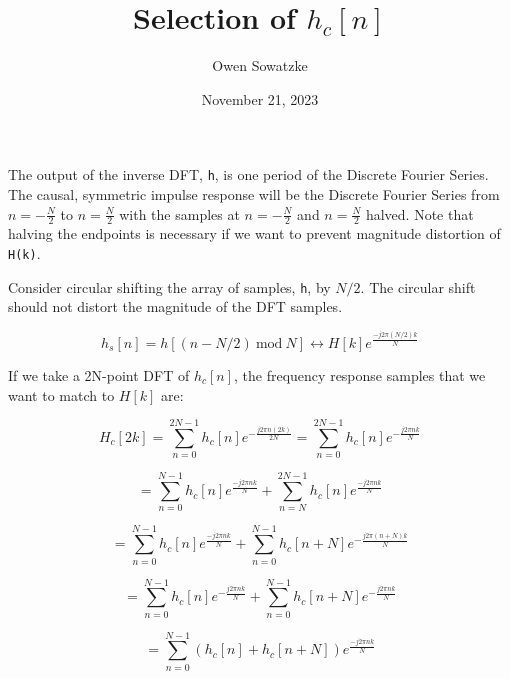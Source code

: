 \documentclass[fleqn]{article}
\title{Selection of $h_c[n]$}
\author{Owen Sowatzke}
\date{November 21, 2023}
\newcommand{\zerodisplayskip}{
	\setlength{\abovedisplayskip}{0pt}%
	\setlength{\belowdisplayskip}{0pt}%
	\setlength{\abovedisplayshortskip}{0pt}%
	\setlength{\belowdisplayshortskip}{0pt}%
	\setlength{\mathindent}{0pt}}
\begin{document}
	\offinterlineskip
	\setlength{\lineskip}{12pt}
	\setlength{\parindent}{0pt} 
	\zerodisplayskip
	\maketitle
	
	The output of the inverse DFT, \texttt{h}, is one period of the Discrete Fourier Series. The causal, symmetric impulse response will be the Discrete Fourier Series from $n=-\frac{N}{2}$ to $n=\frac{N}{2}$ with the samples at $n=-\frac{N}{2}$ and $n=\frac{N}{2}$ halved. Note that halving the endpoints is necessary if we want to prevent magnitude distortion of \texttt{H(k)}.
			 
	Consider circular shifting the array of samples, \texttt{h}, by $N/2$. The circular shift should not distort the magnitude of the DFT samples.
			
	\begin{equation*}
		h_s[n] = h[(n - N/2)\ \text{mod}\ N] \leftrightarrow H[k]e^{\frac{-j{2\pi}(N/2)k}{N}}
	\end{equation*}
			
	If we take a 2N-point DFT of $h_c[n]$, the frequency response samples that we want to match to $H[k]$ are:
			 
	\begin{equation*}
		H_c[2k] = \sum_{n=0}^{2N-1}{h_c[n]e^{-\frac{j2{\pi}n(2k)}{2N}}} = \sum_{n=0}^{2N-1}{h_c[n]e^{-\frac{j2{\pi}nk}{N}}}
	\end{equation*}
			
	\begin{equation*}
		= \sum_{n=0}^{N-1}{h_c[n]e^{\frac{-j2{\pi}nk}{N}}} + \sum_{n=N}^{2N-1}{h_c[n]e^{\frac{-j2{\pi}nk}{N}}}
	\end{equation*}
			
	\begin{equation*}
		= \sum_{n=0}^{N-1}{h_c[n]e^{\frac{-j2{\pi}nk}{N}}} + \sum_{n=0}^{N-1}{h_c[n+N]e^{-\frac{j2{\pi}(n+N)k}{N}}}
	\end{equation*}
			
	\begin{equation*}
		= \sum_{n=0}^{N-1}{h_c[n]e^{-\frac{j2{\pi}nk}{N}}} + \sum_{n=0}^{N-1}{h_c[n+N]e^{-\frac{j2{\pi}nk}{N}}}
	\end{equation*}
			
	\begin{equation*}
		= \sum_{n=0}^{N-1}{(h_c[n] + h_c[n+N])e^{\frac{-j2{\pi}nk}{N}}}
	\end{equation*}
			
\end{document}
